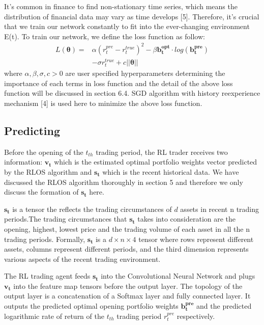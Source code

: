 \documentclass{gapd}
\begin{document}
It's common in finance to find non-stationary time series, which means the distribution of financial data may vary as time develops [5]. Therefore, it's crucial that we train our network constantly to fit into the ever-changing environment E(t). To train our network, we define the loss function as follow:
\begin{equation}
\begin{aligned}
L(\boldsymbol{\theta})=&\alpha (r_t^{pre}-r_t^{true})^2- \beta \mathbf{b_t^{opt}}\cdot log(\mathbf{b_t^{pre}})\\
& - \sigma r_t^{true}+ c \vert \vert \boldsymbol{\theta} \vert \vert
\end{aligned}
\end{equation}
where $\alpha, \beta, \sigma, c>0$ are user specified hyperparameters determining the importance of each terms in loss function and the detail of the above loss function will be discussed in section 6.4. SGD algorithm with history reexperience mechanism [4] is used here to minimize the above loss function. 

\subsection{Predicting}

Before the opening of the $t_{th}$ trading period, the RL trader receives two information: $\mathbf{v_t}$ which is the estimated optimal portfolio weights vector predicted by the RLOS algorithm and $\mathbf{s_t}$ which is the recent historical data. We have discussed the RLOS algorithm thoroughly in section 5 and therefore we only discuss the formation of $\mathbf{s_t}$ here.

$\mathbf{s_t}$ is a tensor the reflects the trading circumstances of $d$ assets in recent n trading periods.The trading circumstances that $\mathbf{s_t}$ takes into consideration are the opening, highest, lowest price and the trading volume of each asset in all the n trading periods. Formally, $\mathbf{s_t}$ is a $d\times n \times 4$ tensor where rows represent different assets, columns represent different periods, and the third dimension represents various aspects of the recent trading environment.

The RL trading agent feeds $\mathbf{s_t}$ into the Convolutional Neural Network and plugs $\mathbf{v_t}$ into the feature map tensors before the output layer. The topology of the output layer is a concatenation of a Softmax layer and fully connected layer. It outputs the predicted optimal opening portfolio weights $\mathbf{b_t^{pre}}$ and the predicted logarithmic rate of return of the $t_{th}$ trading period $r_t^{pre}$  respectively.
\end{document}
